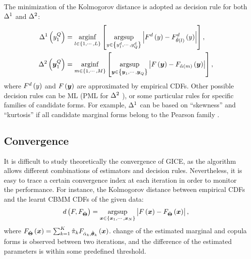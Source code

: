 The minimization of the Kolmogorov distance is adopted as decision rule for both $\blueC{\Delta}^1$ and $\blueC{\Delta}^2$:
\begin{align}
    \label{eq:D1}
    \blueC{\Delta}^1\seq{y_1^Q} &= \arginf{l\in\set{1,\cdots,L}}\interv{\argsup{y\in\set{y_1^d,\cdots,y_Q^d}}\left| F^d\seq{y} - F^d_{\hat{\theta}\seq{l}}\seq{y}\right|}, \\
    \label{eq:D2}
    \blueC{\Delta}^2\seq{\y_1^Q} &= \arginf{m\in\set{1,\cdots,M}}\interv{\argsup{\y\in\set{\y_1,\cdots,\y_Q}}\left| F\seq{\y} - F_{\hat{\alpha}\seq{m}}\seq{\y}\right|},
\end{align}
where $F^d\left(y\right)$ and $F\left(\boldsymbol{y}\right)$ are approximated by empirical CDFs. Other possible decision rules can be ML (PML for $\blueC{\Delta}^2$ \cite{derrode2016unsupervised}), or some particular rules for specific families of candidate forms. For example, $\blueC{\Delta}^1$ can be based on ``skewness'' and ``kurtosis'' if all candidate marginal forms belong to the Pearson family \cite{delignon1997estimation}.

\subsection{Convergence}
\label{sec:Convergence}
It is difficult to study theoretically the convergence of GICE, as the algorithm allows different combinations of estimators and decision rules. Nevertheless, 
it is
easy to trace a certain convergence index at each iteration in order to monitor the performance. For instance, the Kolmogorov distance between empirical CDFs and the learnt CBMM CDFs of the given data:
\begin{equation}
    \label{eq:convergence index}
    d\left(F,F_{\hat{\boldsymbol{\Theta}}}\right) = \underset{\boldsymbol{x}\in\left\{\boldsymbol{x}_1,\cdots,\boldsymbol{x}_N\right\}}{\operatorname{argsup}}\left| F\left(\boldsymbol{x}\right) - F_{\hat{\boldsymbol{\Theta}}}\left(\boldsymbol{x}\right)\right|,
\end{equation}
where $F_{\hat{\boldsymbol{\Theta}}}\left(\boldsymbol{x}\right)=\sum_{k=1}^K \hat{\pi}_k F_{\hat{\alpha}_k,\hat{\boldsymbol{\theta}}_k}\left(\boldsymbol{x}\right)$.
 change of the estimated marginal and copula forms is observed between two iterations, and the difference of the estimated parameters is within some predefined threshold. 

